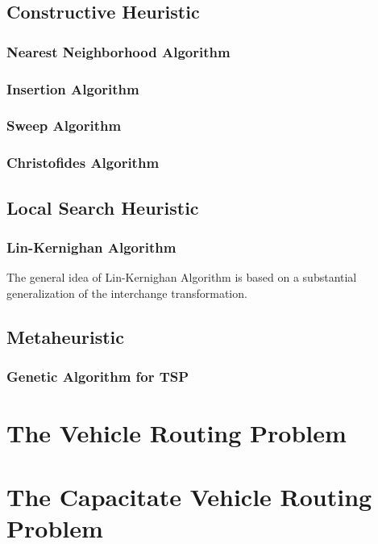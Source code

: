 			\section{Constructive Heuristic}
				\subsection{Nearest Neighborhood Algorithm}

				\subsection{Insertion Algorithm}

				\subsection{Sweep Algorithm}

				\subsection{Christofides Algorithm}

			\section{Local Search Heuristic}
				\subsection{Lin-Kernighan Algorithm}
					The general idea of Lin-Kernighan Algorithm is based on a substantial generalization of the interchange transformation.

			\section{Metaheuristic}
				\subsection{Genetic Algorithm for TSP}


		\chapter{The Vehicle Routing Problem}

		\chapter{The Capacitate Vehicle Routing Problem}

